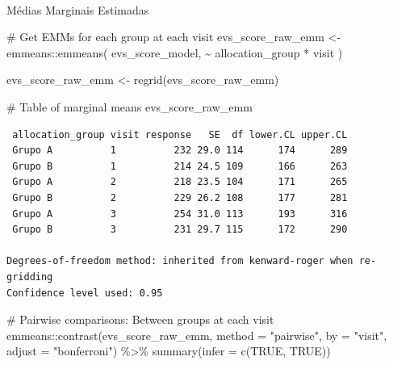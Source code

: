 \documentclass[
  letterpaper,
  DIV=11,
  numbers=noendperiod]{scrartcl}
\makeatletter
\let\oldparagraph\paragraph
\renewcommand{\paragraph}{
    \@ifstar
      \xxxParagraphStar
      \xxxParagraphNoStar
  }
\newcommand{\xxxParagraphStar}[1]{\oldparagraph*{#1}\mbox{}}
\newcommand{\xxxParagraphNoStar}[1]{\oldparagraph{#1}\mbox{}}
\newenvironment{Shaded}{\begin{snugshade}}{\end{snugshade}}
\newcommand{\AttributeTok}[1]{\textcolor[rgb]{0.40,0.45,0.13}{#1}}
\newcommand{\CommentTok}[1]{\textcolor[rgb]{0.37,0.37,0.37}{#1}}
\newcommand{\ConstantTok}[1]{\textcolor[rgb]{0.56,0.35,0.01}{#1}}
\newcommand{\FunctionTok}[1]{\textcolor[rgb]{0.28,0.35,0.67}{#1}}
\newcommand{\NormalTok}[1]{\textcolor[rgb]{0.00,0.23,0.31}{#1}}
\newcommand{\OtherTok}[1]{\textcolor[rgb]{0.00,0.23,0.31}{#1}}
\newcommand{\SpecialCharTok}[1]{\textcolor[rgb]{0.37,0.37,0.37}{#1}}
\newcommand{\StringTok}[1]{\textcolor[rgb]{0.13,0.47,0.30}{#1}}
\makeatother
\begin{document}
\paragraph{Médias Marginais
Estimadas}\label{muxe9dias-marginais-estimadas-16}

\begin{Shaded}
\begin{Highlighting}[]
\CommentTok{\# Get EMMs for each group at each visit}
\NormalTok{evs\_score\_raw\_emm }\OtherTok{\textless{}{-}}\NormalTok{ emmeans}\SpecialCharTok{::}\FunctionTok{emmeans}\NormalTok{(}
\NormalTok{    evs\_score\_model, }
    \SpecialCharTok{\textasciitilde{}}\NormalTok{ allocation\_group }\SpecialCharTok{*}\NormalTok{ visit}
\NormalTok{)}

\NormalTok{evs\_score\_raw\_emm }\OtherTok{\textless{}{-}} \FunctionTok{regrid}\NormalTok{(evs\_score\_raw\_emm)}

\CommentTok{\# Table of marginal means}
\NormalTok{evs\_score\_raw\_emm}
\end{Highlighting}
\end{Shaded}

\begin{verbatim}
 allocation_group visit response   SE  df lower.CL upper.CL
 Grupo A          1          232 29.0 114      174      289
 Grupo B          1          214 24.5 109      166      263
 Grupo A          2          218 23.5 104      171      265
 Grupo B          2          229 26.2 108      177      281
 Grupo A          3          254 31.0 113      193      316
 Grupo B          3          231 29.7 115      172      290

Degrees-of-freedom method: inherited from kenward-roger when re-gridding 
Confidence level used: 0.95 
\end{verbatim}

\begin{Shaded}
\begin{Highlighting}[]
\CommentTok{\# Pairwise comparisons: Between groups at each visit}
\NormalTok{emmeans}\SpecialCharTok{::}\FunctionTok{contrast}\NormalTok{(evs\_score\_raw\_emm, }\AttributeTok{method =} \StringTok{"pairwise"}\NormalTok{, }\AttributeTok{by =} \StringTok{"visit"}\NormalTok{, }\AttributeTok{adjust =} \StringTok{"bonferroni"}\NormalTok{) }\SpecialCharTok{\%\textgreater{}\%} \FunctionTok{summary}\NormalTok{(}\AttributeTok{infer =} \FunctionTok{c}\NormalTok{(}\ConstantTok{TRUE}\NormalTok{, }\ConstantTok{TRUE}\NormalTok{))}
\end{Highlighting}
\end{Shaded}
\end{document}
